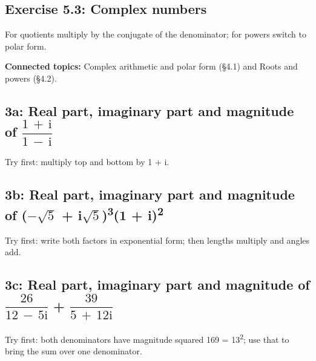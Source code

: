 \documentclass[11pt]{article}
\begin{document}
\begin{keepsection}
\section{Exercise 5.3: Complex numbers}

For quotients multiply by the conjugate of the denominator; for powers switch to polar form.

\textbf{Connected topics:} Complex arithmetic and polar form (§4.1) and Roots and powers (§4.2).

\begin{keepsection}
\subsection{3a: Real part, imaginary part and magnitude of {\small\ensuremath{\dfrac{1\, +\, \mathrm{i}}{1\, -\, \mathrm{i}}}}}

Try first: multiply top and bottom by 1 + i.

\end{keepsection}

\begin{keepsection}
\subsection{3b: Real part, imaginary part and magnitude of (\ensuremath{-}\ensuremath{\sqrt{5}} + i\ensuremath{\sqrt{5}})\textsuperscript{3}(1 + i)\textsuperscript{2}}

Try first: write both factors in exponential form; then lengths multiply and angles add.

\end{keepsection}

\begin{keepsection}
\subsection{3c: Real part, imaginary part and magnitude of {\small\ensuremath{\dfrac{26}{12\, -\, 5\mathrm{i}}}} + {\small\ensuremath{\dfrac{39}{5\, +\, 12\mathrm{i}}}}}

Try first: both denominators have magnitude squared 169 = 13\textsuperscript{2}; use that to bring the sum over one denominator.

\end{keepsection}
\end{keepsection}
\end{document}
